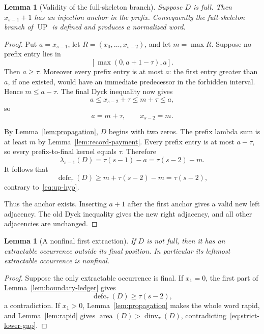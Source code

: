 \documentclass[11pt]{article}
\newtheorem{lemma}[theorem]{Lemma}
\theoremstyle{definition}
\theoremstyle{remark}
\newcommand{\area}{\operatorname{area}}
\newcommand{\dinv}{\operatorname{dinv}}
\newcommand{\defc}{\operatorname{defc}}
\newcommand{\UP}{\operatorname{UP}}
\begin{document}
\begin{lemma}[Validity of the full-skeleton branch]
\label{lem:up-skeleton}
Suppose $D$ is full.  Then $x_{s-1}+1$ has an injection anchor in the prefix.
Consequently the full-skeleton branch of $\UP$ is defined and produces a
normalized word.
\end{lemma}

\begin{proof}
Put $a=x_{s-1}$, let $R=(x_0,\ldots,x_{s-2})$, and let $m=\max R$.
Suppose no prefix entry lies in
\[
  [\max(0,a+1-\tau),a].
\]
Then $a\ge\tau$.  Moreover every prefix entry is at most $a$: the first
entry greater than $a$, if one existed, would have an immediate predecessor
in the forbidden interval.  Hence $m\le a-\tau$.  The final Dyck inequality
now gives
\[
  a\le x_{s-2}+\tau\le m+\tau\le a,
\]
so
\begin{equation}
  a=m+\tau,
  \qquad x_{s-2}=m.
  \label{eq:max-final-jump}
\end{equation}

By Lemma~\ref{lem:propagation}, $D$ begins with two zeros.  The prefix lambda
sum is at least $m$ by Lemma~\ref{lem:record-payment}.  Every prefix entry is
at most $a-\tau$, so every prefix-to-final kernel equals $\tau$.  Therefore
\[
  \lambda_{s-1}(D)=\tau(s-1)-a=\tau(s-2)-m.
\]
It follows that
\[
  \defc_\tau(D)\ge m+\tau(s-2)-m=\tau(s-2),
\]
contrary to~\eqref{eq:up-hyp}.

Thus the anchor exists.  Inserting $a+1$ after the first anchor gives a valid
new left adjacency.  The old Dyck inequality gives the new right adjacency,
and all other adjacencies are unchanged.
\end{proof}

\begin{lemma}[A nonfinal first extraction]
\label{lem:up-first-position}
If $D$ is not full, then it has an extractable occurrence outside its final
position.  In particular its leftmost extractable occurrence is nonfinal.
\end{lemma}

\begin{proof}
Suppose the only extractable occurrence is final.  If $x_1=0$, the first
part of Lemma~\ref{lem:boundary-ledger} gives
\[
  \defc_\tau(D)\ge\tau(s-2),
\]
a contradiction.  If $x_1>0$, Lemma~\ref{lem:propagation} makes the whole
word rapid, and Lemma~\ref{lem:rapid} gives
$\area(D)>\dinv_\tau(D)$, contradicting~\eqref{eq:strict-lower-gap}.
\end{proof}
\end{document}
